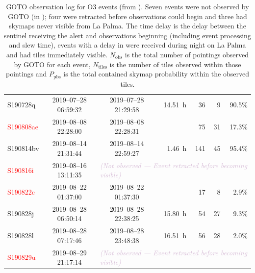 \begin{colsection}
\begin{table}[t]
\begin{footnotesize}
\begin{center}
\begin{tabular}{l|ccrrrr}
                            S190728q   & 2019--07--28 06:59:32 & 2019--07--28 21:29:58 &              \SI{14.51}{\hour} &  36 &   9 & 90.5\% \\
            \textcolor{Red}{S190808ae} & 2019--08--08 22:28:00 & 2019--08--08 22:28:31 &  {NavyBlue}{31\,s} &  75 &  31 & 17.3\% \\
                            S190814bv  & 2019--08--14 21:31:44 & 2019--08--14 22:59:27 &              \SI{ 1.46}{\hour} & 141 &  45 & 95.4\% \\
            \textcolor{Red}{S190816i}  & 2019--08--16 13:11:35 & \multicolumn{5}{l}{\textcolor{Thistle}{\textit{(Not observed --- Event retracted before becoming visible)}}} \\
            \textcolor{Red}{S190822c}  & 2019--08--22 01:37:00 & 2019--08--22 01:37:30 &  {NavyBlue}{30\,s} &  17 &   8 &  2.9\% \\
                            S190828j   & 2019--08--28 06:50:14 & 2019--08--28 22:38:25 &              \SI{15.80}{\hour} &  54 &  27 &  9.3\% \\
                            S190828l   & 2019--08--28 07:17:46 & 2019--08--28 23:48:38 &              \SI{16.51}{\hour} &  56 &  28 &  2.0\% \\
            \textcolor{Red}{S190829u}  & 2019--08--29 21:17:14 & \multicolumn{5}{l}{\textcolor{Thistle}{\textit{(Not observed --- Event retracted before becoming visible)}}} \\
        \end{tabular}
    \end{center}
    \end{footnotesize}
    \caption[GOTO observation log for O3 events so far]{
        GOTO observation log for O3 events (from ). Seven events were not observed by GOTO (in ); four were retracted before observations could begin and three had skymaps never visible from La Palma. The time delay is the delay between the sentinel receiving the alert and observations beginning (including event processing and slew time), events with a delay in  were received during night on La Palma and had tiles immediately visible. $N_\text{obs}$ is the total number of pointings observed by GOTO for each event, $N_\text{tiles}$ is the number of tiles observed within those pointings and $P_\text{pbs}$ is the total contained skymap probability within the observed tiles.
    }\label{tab:obs_log}
\end{table}


\end{colsection}
